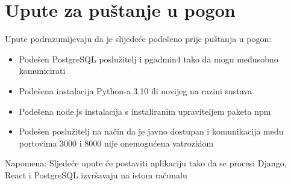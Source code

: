 			
			\eject 
		
		\section{Upute za puštanje u pogon}
			
		
			
			
			
			Upute podrazumijevaju da je slijedeće podešeno prije puštanja u pogon:
			\begin{itemize}
				\item Podešen PostgreSQL poslužitelj i pgadmin4 tako da mogu međusobno komunicirati
				\item Podešena instalacija Python-a 3.10 ili novijeg na razini sustava
				\item Podešena node.js instalacija s instaliranim upraviteljem paketa npm
				\item Podešen poslužitelj na način da je javno dostupan i komunikacija među portovima 3000 i 8000 nije onemogućena vatrozidom
			\end{itemize}	
			Napomena: Sljedeće upute će postaviti aplikaciju tako da se procesi Django, React i PostgreSQL izvršavaju na istom računalu
			
